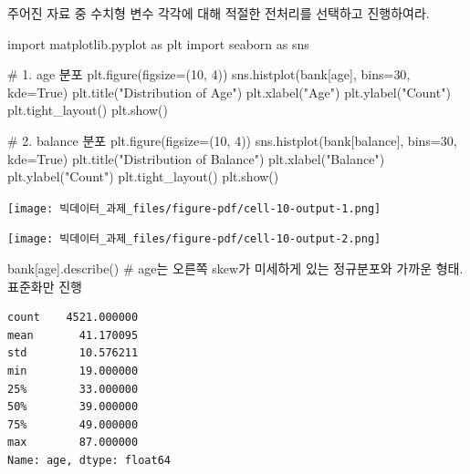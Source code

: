 \documentclass[
  a4paper,
  DIV=11,
  numbers=noendperiod]{scrreprt}
\newenvironment{Shaded}{\begin{snugshade}}{\end{snugshade}}
\newcommand{\CommentTok}[1]{\textcolor[rgb]{0.37,0.37,0.37}{#1}}
\newcommand{\DecValTok}[1]{\textcolor[rgb]{0.68,0.00,0.00}{#1}}
\newcommand{\ImportTok}[1]{\textcolor[rgb]{0.00,0.46,0.62}{#1}}
\newcommand{\NormalTok}[1]{\textcolor[rgb]{0.00,0.23,0.31}{#1}}
\newcommand{\OperatorTok}[1]{\textcolor[rgb]{0.37,0.37,0.37}{#1}}
\newcommand{\StringTok}[1]{\textcolor[rgb]{0.13,0.47,0.30}{#1}}
\newcommand{\VariableTok}[1]{\textcolor[rgb]{0.07,0.07,0.07}{#1}}
\begin{document}
주어진 자료 중 수치형 변수 각각에 대해 적절한 전처리를 선택하고
진행하여라.

\begin{Shaded}
\begin{Highlighting}[]
\ImportTok{import}\NormalTok{ matplotlib.pyplot }\ImportTok{as}\NormalTok{ plt}
\ImportTok{import}\NormalTok{ seaborn }\ImportTok{as}\NormalTok{ sns}

\CommentTok{\# 1. age 분포}
\NormalTok{plt.figure(figsize}\OperatorTok{=}\NormalTok{(}\DecValTok{10}\NormalTok{, }\DecValTok{4}\NormalTok{))}
\NormalTok{sns.histplot(bank[}\StringTok{\textquotesingle{}age\textquotesingle{}}\NormalTok{], bins}\OperatorTok{=}\DecValTok{30}\NormalTok{, kde}\OperatorTok{=}\VariableTok{True}\NormalTok{)}
\NormalTok{plt.title(}\StringTok{"Distribution of Age"}\NormalTok{)}
\NormalTok{plt.xlabel(}\StringTok{"Age"}\NormalTok{)}
\NormalTok{plt.ylabel(}\StringTok{"Count"}\NormalTok{)}
\NormalTok{plt.tight\_layout()}
\NormalTok{plt.show()}

\CommentTok{\# 2. balance 분포}
\NormalTok{plt.figure(figsize}\OperatorTok{=}\NormalTok{(}\DecValTok{10}\NormalTok{, }\DecValTok{4}\NormalTok{))}
\NormalTok{sns.histplot(bank[}\StringTok{\textquotesingle{}balance\textquotesingle{}}\NormalTok{], bins}\OperatorTok{=}\DecValTok{30}\NormalTok{, kde}\OperatorTok{=}\VariableTok{True}\NormalTok{)}
\NormalTok{plt.title(}\StringTok{"Distribution of Balance"}\NormalTok{)}
\NormalTok{plt.xlabel(}\StringTok{"Balance"}\NormalTok{)}
\NormalTok{plt.ylabel(}\StringTok{"Count"}\NormalTok{)}
\NormalTok{plt.tight\_layout()}
\NormalTok{plt.show()}
\end{Highlighting}
\end{Shaded}

\texttt{[image: 빅데이터\_과제\_files/figure-pdf/cell-10-output-1.png]}

\texttt{[image: 빅데이터\_과제\_files/figure-pdf/cell-10-output-2.png]}

\begin{Shaded}
\begin{Highlighting}[]
\NormalTok{bank[}\StringTok{\textquotesingle{}age\textquotesingle{}}\NormalTok{].describe()}
\CommentTok{\# age는 오른쪽 skew가 미세하게 있는 정규분포와 가까운 형태. 표준화만 진행}
\end{Highlighting}
\end{Shaded}

\begin{verbatim}
count    4521.000000
mean       41.170095
std        10.576211
min        19.000000
25%        33.000000
50%        39.000000
75%        49.000000
max        87.000000
Name: age, dtype: float64
\end{verbatim}
\end{document}
